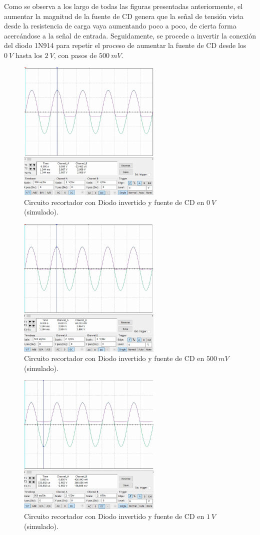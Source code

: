 \documentclass[journal]{IEEEtran}
\begin{document}
Como se observa a los largo de todas las figuras presentadas anteriormente, el aumentar la magnitud de la fuente de CD
genera que la señal de tensión vista desde la resistencia de carga vaya aumentando poco a poco, de cierta forma acercándose 
a la señal de entrada. Seguidamente, se procede a invertir la conexión del diodo 1N914 para repetir el proceso de aumentar 
la fuente de CD desde los $0~V$ hasta los $2~V$, con pasos de $500~mV$.
\begin{figure}[H]
        \centering
        \includegraphics[width=2.7in]{SignalSimulated_10.png}
        \caption{Circuito recortador con Diodo invertido y fuente de CD en $0~V$ (simulado).}
        \label{fig:SignalSimulated_10}
\end{figure}
\begin{figure}[H]
        \centering
        \includegraphics[width=2.7in]{SignalSimulated_11.png}
        \caption{Circuito recortador con Diodo invertido y fuente de CD en $500~mV$ (simulado).}
        \label{fig:SignalSimulated_11}
\end{figure}
\begin{figure}[H]
        \centering
        \includegraphics[width=2.7in]{SignalSimulated_12.png}
        \caption{Circuito recortador con Diodo invertido y fuente de CD en $1~V$ (simulado).}
        \label{fig:SignalSimulated_12}
\end{figure}
\end{document}
